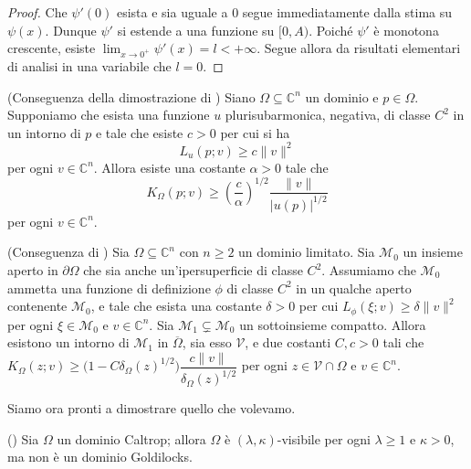 \begin{proof}
    Che $\psi'(0)$ esista e sia uguale a $0$ segue immediatamente dalla stima su $\psi(x)$. Dunque $\psi'$ si estende a una funzione su $[0,A)$. Poiché $\psi'$ è monotona crescente, esiste $\displaystyle\lim_{x\longrightarrow0^+}\psi'(x)=l<+\infty$. Segue allora da risultati elementari di analisi in una variabile che $l=0$.
\end{proof}

\begin{lm} \label{pshestimate}
    (Conseguenza della dimostrazione di \cite[Proposition 6]{Si}) Siano $\Omega\subseteq\mathbb{C}^n$ un dominio e $p\in\Omega$. Supponiamo che esista una funzione $u$ plurisubarmonica, negativa, di classe $C^2$ in un intorno di $p$ e tale che esiste $c>0$ per cui si ha
    $$L_u(p;v) \ge c\|v\|^2$$
    per ogni $v\in\mathbb{C}^n$. Allora esiste una costante $\alpha>0$ tale che
    $$K_\Omega(p;v)\ge\left(\frac{c}{\alpha}\right)^{1/2}\frac{\|v\|}{|u(p)|^{1/2}}$$
    per ogni $v\in\mathbb{C}^n$.
\end{lm}

\begin{lm}\label{psdcvxcpt}
    (Conseguenza di \cite[Theorem B]{M}) Sia $\Omega\subseteq\mathbb{C}^n$ con $n\ge 2$ un dominio limitato. Sia $\mathcal{M}_0$ un insieme aperto in $\partial\Omega$ che sia anche un'ipersuperficie di classe $C^2$. Assumiamo che $\mathcal{M}_0$ ammetta una funzione di definizione $\phi$ di classe $C^2$ in un qualche aperto contenente $\mathcal{M}_0$, e tale che esista una costante $\delta>0$ per cui $L_\phi(\xi;v)\ge\delta\|v\|^2$ per ogni $\xi\in\mathcal{M}_0$ e $v\in\mathbb{C}^n$. Sia $\mathcal{M}_1\subsetneq\mathcal{M}_0$ un sottoinsieme compatto. Allora esistono un intorno di $\mathcal{M}_1$ in $\overline{\Omega}$, sia esso $\mathcal{V}$, e due costanti $C,c>0$ tali che $K_\Omega(z;v)\ge \big(1-C\delta_\Omega(z)^{1/2}\big)\dfrac{c\|v\|}{\delta_\Omega(z)^{1/2}}$ per ogni $z\in\mathcal{V}\cap\Omega$ e $v\in\mathbb{C}^n$.
\end{lm}

Siamo ora pronti a dimostrare quello che volevamo.

\begin{thm} \label{ilprecteo}
    (\cite[Theorem 1.4]{BM}) Sia $\Omega$ un dominio Caltrop; allora $\Omega$ è $(\lambda,\kappa)$-visibile per ogni $\lambda \ge 1$ e $\kappa>0$, ma non è un dominio Goldilocks.
\end{thm}

